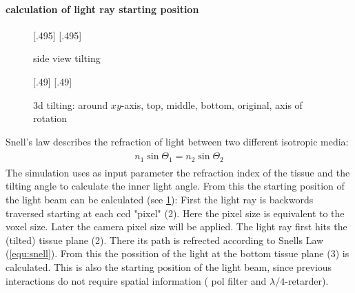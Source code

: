 \paragraph{calculation of light ray starting position}
% 
\begin{figure}[!t]
\def\tikzwidth{0.42\textwidth}
% 
[.495\textwidth]{
\def\tilt{0}
\def\nindex{2.25}
}
% 
[.495\textwidth]{
}
\caption{side view tilting}
\label{fig:tilted_side_view}
\end{figure}
% 
\begin{figure}[!t]
% 
\def\tikzheight{0.42\textwidth}
{}[.49\textwidth]{
}
% 
[.49\textwidth]{
}
% 
\tikzset{external/export=false}
\caption[3d tilting]{3d tilting: around $xy$-axis, \raisebox{.25em}{\tikz \draw[red,thick](0,0)--(0.25,0);} top, \raisebox{.25em}{\tikz \draw[green,thick](0,0)--(0.25,0);} middle, \raisebox{.25em}{\tikz \draw[blue,thick](0,0)--(0.25,0);} bottom, \raisebox{.25em}{\tikz \draw[dash pattern=on 1.25pt off 1.25pt,thick](0,0)--(0.25,0);} original, \raisebox{.25em}{\tikz \draw[gray](0,0)--(0.25,0);} axis of rotation }
\end{figure}
% 
Snell's law describes the refraction of light between two different isotropic media:
\begin{align}
\begin{split}
    n_1 \sin{\Theta_1} = n_2 \sin{\Theta_2}
\end{split}
\label{equ:snell}
\end{align}
% 
The simulation uses as input parameter the refraction index of the tissue and the tilting angle to calculate the inner light angle.
From this the starting position of the light beam can be calculated (see \cref{fig:tilted_side_view}):
% 
First the light ray is backwords traversed starting at each ccd "pixel" (2).
Here the pixel size is equivalent to the voxel size.
Later the camera pixel size will be applied.
The light ray first hits the (tilted) tissue plane (2).
There its path is refrected according to Snells Law (\cref{equ:snell}).
From this the possition of the light at the bottom tissue plane (3) is calculated.
This is also the starting position of the light beam, since previous interactions do not require spatial information (\ie{} pol filter and $\lambda/4$-retarder).\\
